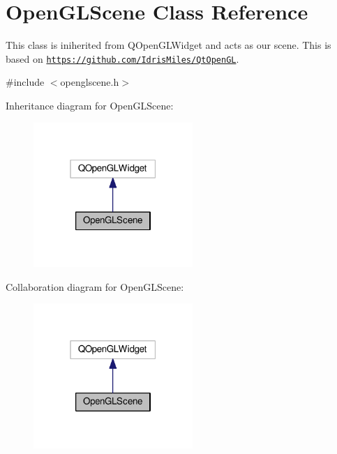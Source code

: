 \hypertarget{classOpenGLScene}{}\section{Open\+G\+L\+Scene Class Reference}
\label{classOpenGLScene}


This class is iniherited from Q\+Open\+G\+L\+Widget and acts as our scene. This is based on \href{https://github.com/IdrisMiles/QtOpenGL}{\tt https\+://github.\+com/\+Idris\+Miles/\+Qt\+Open\+GL}.  




{\ttfamily \#include $<$openglscene.\+h$>$}



Inheritance diagram for Open\+G\+L\+Scene\+:\nopagebreak
\begin{figure}[H]
\begin{center}
\leavevmode
\includegraphics[width=171pt]{de/d3e/classOpenGLScene__inherit__graph}
\end{center}
\end{figure}


Collaboration diagram for Open\+G\+L\+Scene\+:\nopagebreak
\begin{figure}[H]
\begin{center}
\leavevmode
\includegraphics[width=171pt]{da/d38/classOpenGLScene__coll__graph}
\end{center}
\end{figure}
